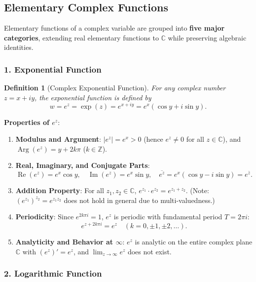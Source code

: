 \documentclass[11pt,a4paper]{article}
\theoremstyle{definitionbreak}
\newtheorem{definition}{Definition}
\theoremstyle{examplebreak}
\theoremstyle{plain}
\begin{document}
\subsection{Elementary Complex Functions}

Elementary functions of a complex variable are grouped into \textbf{five major categories}, extending real elementary functions to $\mathbb{C}$ while preserving algebraic identities.

\subsubsection{1. Exponential Function}

\begin{definition}[Complex Exponential Function]
For any complex number $z = x + iy$, the exponential function is defined by
\[
    w = e^z = \exp(z) = e^{x + iy} = e^x (\cos y + i \sin y).
\]
\end{definition}

\textbf{Properties of $e^z$}:
\begin{enumerate}
    \item \textbf{Modulus and Argument}: $|e^z| = e^x > 0$ (hence $e^z \neq 0$ for all $z \in \mathbb{C}$), and $\operatorname{Arg}(e^z) = y + 2k\pi$ ($k \in \mathbb{Z}$).
    \item \textbf{Real, Imaginary, and Conjugate Parts}:
    \[
        \operatorname{Re}(e^z) = e^x \cos y, \quad \operatorname{Im}(e^z) = e^x \sin y, \quad \overline{e^z} = e^x(\cos y - i\sin y) = e^{\overline{z}}.
    \]
    \item \textbf{Addition Property}: For all $z_1, z_2 \in \mathbb{C}$, $e^{z_1} \cdot e^{z_2} = e^{z_1 + z_2}$. (Note: $(e^{z_1})^{z_2} = e^{z_1 z_2}$ does not hold in general due to multi-valuedness.)
    \item \textbf{Periodicity}: Since $e^{2k\pi i} = 1$, $e^z$ is periodic with fundamental period $T = 2\pi i$:
    \[
        e^{z + 2k\pi i} = e^z \quad (k = 0, \pm 1, \pm 2, \dots).
    \]
    \item \textbf{Analyticity and Behavior at $\infty$}: $e^z$ is analytic on the entire complex plane $\mathbb{C}$ with $(e^z)' = e^z$, and $\lim_{z \to \infty} e^z$ does not exist.
\end{enumerate}

\subsubsection{2. Logarithmic Function}
\end{document}

